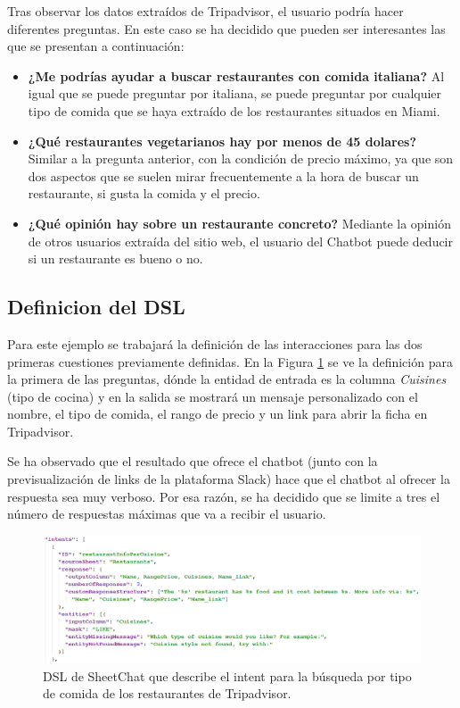 Tras observar los datos extraídos de Tripadvisor, el usuario podría hacer diferentes preguntas. En este caso se ha decidido que pueden ser interesantes las que se presentan a continuación:
\begin{itemize}
	\item \textbf{¿Me podrías ayudar a buscar restaurantes con comida italiana?} Al igual que se puede preguntar por italiana, se puede preguntar por cualquier tipo de comida que se haya extraído de los restaurantes situados en Miami.
	\item \textbf{¿Qué restaurantes vegetarianos hay por menos de 45 dolares?} Similar a la pregunta anterior, con la condición de precio máximo, ya que son dos aspectos que se suelen mirar frecuentemente a la hora de buscar un restaurante, si gusta la comida y el precio.
	\item \textbf{¿Qué opinión hay sobre un restaurante concreto?} Mediante la opinión de otros usuarios extraída del sitio web, el usuario del Chatbot puede deducir si un restaurante es bueno o no.
\end{itemize}

\subsection{Definicion del DSL}
\label{sec:DSLTripadvisor}

Para este ejemplo se trabajará la definición de las interacciones para las dos primeras cuestiones previamente definidas. En la Figura \ref{fig:DSLTripadvisor1} se ve la definición para la primera de las preguntas, dónde la entidad de entrada es la columna \emph{Cuisines} (tipo de cocina) y en la salida se mostrará un mensaje personalizado con el nombre, el tipo de comida, el rango de precio y un link para abrir la ficha en Tripadvisor.

Se ha observado que el resultado que ofrece el chatbot (junto con la previsualización de links de la plataforma Slack) hace que el chatbot al ofrecer la respuesta sea muy verboso. Por esa razón, se ha decidido que se limite a tres el número de respuestas máximas que va a recibir el usuario.

\begin{figure}[htb]
	\centering
	\includegraphics[width=1\textwidth]{./figs/DSLTripadvisor1.png}
	\caption{DSL de SheetChat que describe el intent para la búsqueda por tipo de comida de los restaurantes de Tripadvisor.}
	\label{fig:DSLTripadvisor1}
\end{figure}



